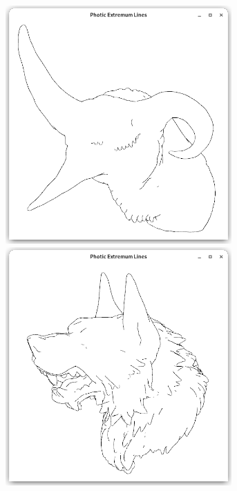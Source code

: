 \documentclass[9pt,fleqn,twoside,twocolumn]{stdglobal}
\begin{document}
\begin{figure}
\begin{subfigure}[t]{0.19\textwidth}
        \includegraphics[width=0.95\textwidth,trim={15px 15 15 50},clip]{images/results/dragon-head-contours.png}
        \includegraphics[width=0.95\textwidth,trim={15px 15 15 50},clip]{images/results/werewolf-contours.png}

\end{subfigure}
\end{figure}
\end{document}
